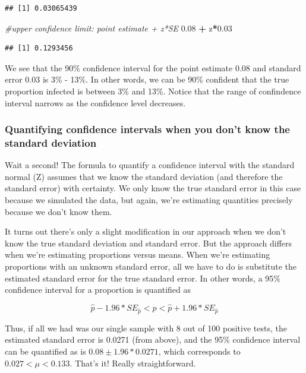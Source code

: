 \documentclass[
]{book}
\newenvironment{Shaded}{\begin{snugshade}}{\end{snugshade}}
\newcommand{\CommentTok}[1]{\textcolor[rgb]{0.56,0.35,0.01}{\textit{#1}}}
\newcommand{\FloatTok}[1]{\textcolor[rgb]{0.00,0.00,0.81}{#1}}
\newcommand{\NormalTok}[1]{#1}
\newcommand{\SpecialCharTok}[1]{\textcolor[rgb]{0.81,0.36,0.00}{\textbf{#1}}}
\begin{document}
\begin{verbatim}
## [1] 0.03065439
\end{verbatim}

\begin{Shaded}
\begin{Highlighting}[]
\CommentTok{\#upper confidence limit: point estimate + z*SE}
\FloatTok{0.08} \SpecialCharTok{+}\NormalTok{ z}\SpecialCharTok{*}\FloatTok{0.03}
\end{Highlighting}
\end{Shaded}

\begin{verbatim}
## [1] 0.1293456
\end{verbatim}

We see that the 90\% confidence interval for the point estimate 0.08 and standard error 0.03 is 3\% - 13\%. In other words, we can be 90\% confident that the true proportion infected is between 3\% and 13\%. Notice that the range of confindence interval narrows as the confidence level decreases.

\subsubsection{Quantifying confidence intervals when you don't know the standard deviation}\label{quantifying-confidence-intervals-when-you-dont-know-the-standard-deviation}

Wait a second! The formula to quantify a confidence interval with the standard normal (Z) assumes that we know the standard deviation (and therefore the standard error) with certainty. We only know the true standard error in this case because we simulated the data, but again, we're estimating quantities precisely because we don't know them.

It turns out there's only a slight modification in our approach when we don't know the true standard deviation and standard error. But the approach differs when we're estimating proportions versus means. When we're estimating proportions with an unknown standard error, all we have to do is substitute the estimated standard error for the true standard error. In other words, a 95\% confidence interval for a proportion is quantified as

\[
\hat{p} -1.96*SE_{\hat{p}} < p < \hat{p} +1.96*SE_{\hat{p}}
\]

Thus, if all we had was our single sample with 8 out of 100 positive tests, the estimated standard error is 0.0271 (from above), and the 95\% confidence interval can be quantified as is \(0.08\pm 1.96*0.0271\), which corresponds to \(0.027 < \mu < 0.133\). That's it! Really straightforward.
\end{document}
